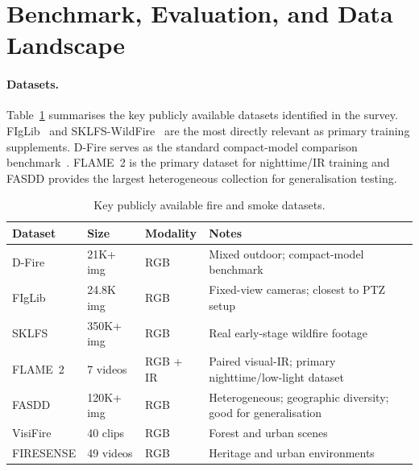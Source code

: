 \documentclass[11pt,twocolumn]{article}
\begin{document}
\section{Benchmark, Evaluation, and Data Landscape}
\label{sec:benchmarks}

\paragraph{Datasets.}
Table~\ref{tab:datasets} summarises the key publicly available
datasets identified in the survey. FIgLib~\cite{figlib2022} and
SKLFS-WildFire~\cite{wildfire2023} are the most directly relevant
as primary training supplements. D-Fire serves as the standard
compact-model comparison benchmark~\cite{uncertainty2025}. FLAME~2
is the primary dataset for nighttime/IR training and FASDD provides
the largest heterogeneous collection for generalisation testing.

\begin{table}[h]
\caption{Key publicly available fire and smoke datasets.}
\label{tab:datasets}
\vskip 0.1in
\begin{center}
\begin{small}
\begin{tabular}{p{1.3cm} p{1.1cm} p{1.2cm} p{2.2cm}}
\toprule
\textbf{Dataset} & \textbf{Size} & \textbf{Modality}
& \textbf{Notes} \\
\midrule
D-Fire    & 21K+ img  & RGB       & Mixed outdoor; compact-model benchmark \\
FIgLib    & 24.8K img & RGB       & Fixed-view cameras; closest to PTZ setup \\
SKLFS     & 350K+ img & RGB       & Real early-stage wildfire footage \\
FLAME~2   & 7 videos  & RGB + IR  & Paired visual-IR; primary nighttime/low-light dataset \\
FASDD     & 120K+ img & RGB       & Heterogeneous; geographic diversity; good for generalisation \\
VisiFire  & 40 clips  & RGB       & Forest and urban scenes \\
FIRESENSE & 49 videos & RGB       & Heritage and urban environments \\
\bottomrule
\end{tabular}
\end{small}
\end{center}
\end{table}
\end{document}
